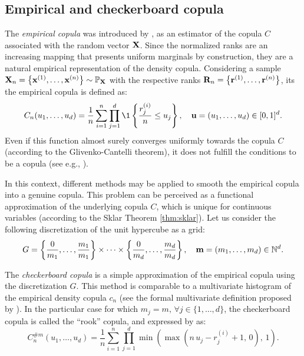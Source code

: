 \subsection{Empirical and checkerboard copula}

The \textit{empirical copula} was introduced by \citet{deheuvels_1979_empirical_copula}, as an estimator of the copula $C$ associated with the random vector ${\bf X}$. 
Since the normalized ranks are an increasing mapping that presents uniform marginals by construction, they are a natural empirical representation of the density copula. 
Considering a sample ${\bf X}_n = \left\{{\bf x}^{(1)}, \dots, {\bf x}^{(n)}\right\} \sim \mathbb{P}_{{\bf X}}$ with the respective ranks ${\bf R}_n = \left\{{\bf r}^{(1)}, \dots, {\bf r}^{(n)}\right\}$, its the empirical copula is defined as: 
\begin{equation}
    C_n(u_1, \dots, u_d) = \frac1n \sum_{i=1}^{n} \prod_{j=1}^{d} \1 \left\{ \frac{r_j^{(i)}}{n} \leq u_j \right\}, \quad  \bu = (u_1, \dots, u_d) \in [0, 1]^d.
    \label{eq:empirical_copula}
\end{equation}
Even if this function almost surely converges uniformly towards the copula $C$ (according to the Glivenko-Cantelli theorem), it does not fulfill the conditions to be a copula (see e.g., \citealp{gonzalez_2021_checkerboard_copula}). 

In this context, different methods may be applied to smooth the empirical copula into a genuine copula. 
This problem can be perceived as a functional approximation of the underlying copula $C$, which is unique for continuous variables (according to the Sklar Theorem \ref{thm:sklar}). 
Let us consider the following discretization of the unit hypercube as a grid: 
\begin{equation}
    G=\left\{\frac{0}{m_1}, \dots, \frac{m_1}{m_1}\right\} \times \dots \times \left\{\frac{0}{m_d}, \dots, \frac{m_d}{m_d}\right\}, \quad {\bf m} = (m_1, \dots, m_d) \in \mathbb{N}^d. 
\end{equation}

The \textit{checkerboard copula} is a simple approximation of the empirical copula using the discretization $G$. 
This method is comparable to a multivariate histogram of the empirical density copula $c_n$ (see the formal multivariate definition proposed by \citealp{cottin_2014_bernstein}).
In the particular case for which $m_j=m, \, \forall j \in \{1, \dots, d\}$, the checkerboard copula is called the ``rook'' copula, and expressed by \citet{segers_2017} as: 
\begin{equation}
    C_n^{\#m}(u_1, \dots, u_d) = \frac1n \sum_{i=1}^{n} \prod_{j=1}^{d} \min\left(\max(n\, u_j - r_j^{(i)} +1, \, 0), \, 1\right).
\end{equation}


